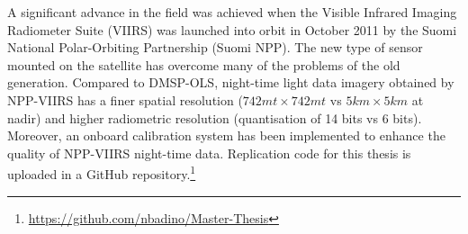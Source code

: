 A significant advance in the field was achieved when the Visible Infrared Imaging Radiometer Suite (VIIRS) was launched into orbit in October 2011 by the Suomi National Polar-Orbiting Partnership (Suomi NPP). The new type of sensor mounted on the satellite has overcome many of the problems of the old generation. Compared to DMSP-OLS, night-time light data imagery obtained by NPP-VIIRS has a finer spatial resolution ($742mt \times 742mt$ vs $5km \times 5km$ at nadir) and higher radiometric resolution (quantisation of 14 bits vs 6 bits). Moreover, an onboard calibration system has been implemented to enhance the quality of NPP-VIIRS night-time data. 
Replication code for this thesis is uploaded in a GitHub repository.\footnote{\url{https://github.com/nbadino/Master-Thesis}}
